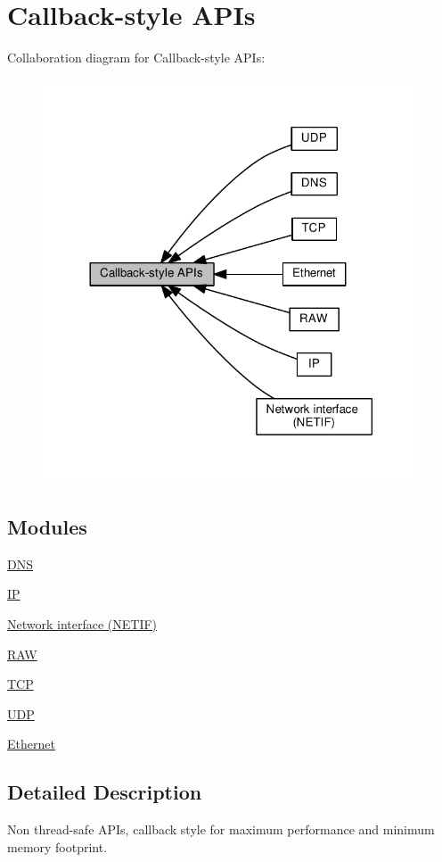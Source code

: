 \hypertarget{group__callbackstyle__api}{}\section{Callback-\/style A\+P\+Is}
\label{group__callbackstyle__api}
Collaboration diagram for Callback-\/style A\+P\+Is\+:
\nopagebreak
\begin{figure}[H]
\begin{center}
\leavevmode
\includegraphics[width=317pt]{group__callbackstyle__api}
\end{center}
\end{figure}
\subsection*{Modules}
\begin{DoxyCompactItemize}
\item 
\hyperlink{group__dns}{D\+NS}
\item 
\hyperlink{group__ip}{IP}
\item 
\hyperlink{group__netif}{Network interface (\+N\+E\+T\+I\+F)}
\item 
\hyperlink{group__raw__raw}{R\+AW}
\item 
\hyperlink{group__tcp__raw}{T\+CP}
\item 
\hyperlink{group__udp__raw}{U\+DP}
\item 
\hyperlink{group__ethernet}{Ethernet}
\end{DoxyCompactItemize}


\subsection{Detailed Description}
Non thread-\/safe A\+P\+Is, callback style for maximum performance and minimum memory footprint. 